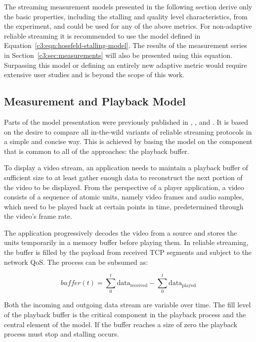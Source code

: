 The streaming measurement models presented in the following section derive only the basic properties, including the stalling and quality level characteristics, from the experiment, and could be used for any of the above metrics. For non-adaptive reliable streaming it is recommended to use the model defined in Equation~\ref{c3:eqn:hossfeld-stalling-model}. The results of the measurement series in Section~\ref{c3:sec:measurements} will also be presented using this equation. Surpassing this model or defining an entirely new adaptive metric would require extensive user studies and is beyond the scope of this work.

\subsection{Measurement and Playback Model}
\label{c3:sec:model}

Parts of the model presentation were previously published in \cite{cs3518}, \cite{metzger2011delivery}, and \cite{6229739}. It is based on the desire to compare all in-the-wild variants of reliable streaming protocols in a simple and concise way. This is achieved by basing the model on the component that is common to all of the approaches: the playback buffer.

To display a video stream, an application needs to maintain a playback buffer of sufficient size to at least gather enough data to reconstruct the next portion of the video to be displayed. From the perspective of a player application, a video consists of a sequence of atomic units, namely video frames and audio samples, which need to be played back at certain points in time, predetermined through the video's frame rate. 

The application progressively decodes the video from a source and stores the units temporarily in a memory buffer before playing them. In reliable streaming, the buffer is filled by the payload from received \gls{TCP} segments and subject to the network \gls{QoS}. The process can be subsumed as:

\begin{equation*}
	\mathit{buffer}(t) = \sum_{0}^{t} \text{data}_\mathrm{received} - \sum_{0}^{t} \text{data}_\mathrm{played}
\end{equation*}

Both the incoming and outgoing data stream are variable over time. The fill level of the playback buffer is the critical component in the playback process and the central element of the model. If the buffer reaches a size of zero the playback process must stop and stalling occurs.

